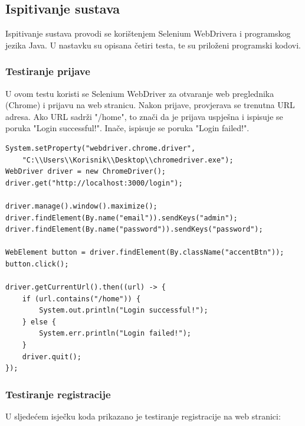 			\subsection{Ispitivanje sustava}
			
			Ispitivanje sustava provodi se korištenjem Selenium WebDrivera i programskog jezika Java. U nastavku su opisana četiri testa, te su priloženi programski kodovi.
			
			\subsubsection{Testiranje prijave}

			U ovom testu koristi se Selenium WebDriver za otvaranje web preglednika (Chrome) i prijavu na web stranicu. Nakon prijave, provjerava se trenutna URL adresa. Ako URL sadrži "/home", to znači da je prijava uspješna i ispisuje se poruka "Login successful!". Inače, ispisuje se poruka "Login failed!".

			\begin{lstlisting}
System.setProperty("webdriver.chrome.driver", 
	"C:\\Users\\Korisnik\\Desktop\\chromedriver.exe");
WebDriver driver = new ChromeDriver();
driver.get("http://localhost:3000/login");

driver.manage().window().maximize();
driver.findElement(By.name("email")).sendKeys("admin");
driver.findElement(By.name("password")).sendKeys("password");

WebElement button = driver.findElement(By.className("accentBtn"));
button.click();

driver.getCurrentUrl().then((url) -> {
	if (url.contains("/home")) {
		System.out.println("Login successful!");
	} else {
		System.err.println("Login failed!");
	}
	driver.quit();        
});	

			\end{lstlisting}
			
			\subsubsection{Testiranje registracije}

			U sljedećem isječku koda prikazano je testiranje registracije na web stranici:
			

